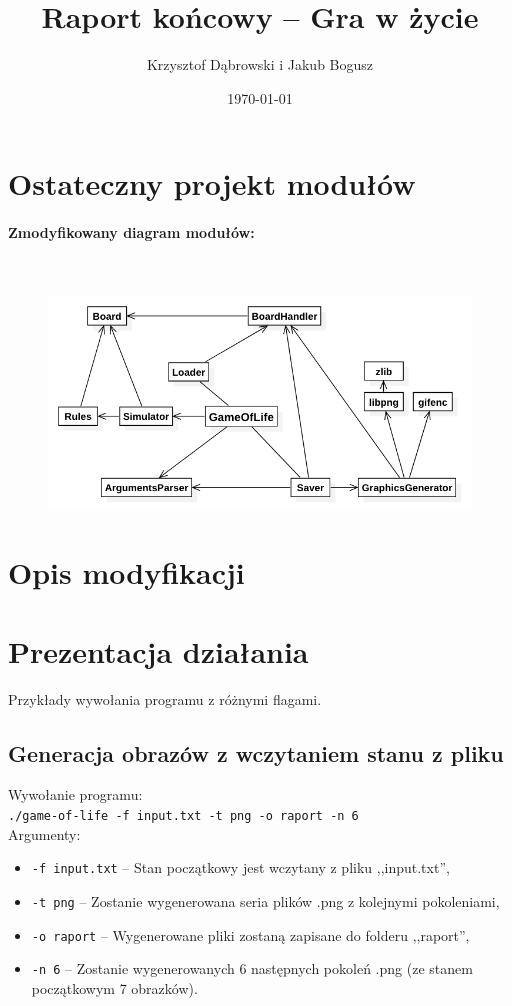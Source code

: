 \documentclass{mwart}
\title{Raport końcowy -- Gra w życie}
\author{Krzysztof Dąbrowski i Jakub Bogusz}
\date{\today}
\begin{document}
\maketitle{}

\tableofcontents{}

\section{Ostateczny projekt modułów}
\paragraph{Zmodyfikowany diagram modułów:}\mbox{}\\
\begin{figure}[H]
	\centering
	\def\svgwidth{\columnwidth}
	\includegraphics[width=13cm]{diagram_modulow.png}
\end{figure}

\section{Opis modyfikacji}

\section{Prezentacja działania}
Przykłady wywołania programu z różnymi flagami.

\subsection{Generacja obrazów z wczytaniem stanu z pliku}
\noindent{}Wywołanie programu: \\
\texttt{./game-of-life -f input.txt -t png -o raport -n 6} \\
Argumenty:
\begin{itemize}
\item \texttt{-f input.txt} -- Stan początkowy jest wczytany z pliku ,,input.txt'',
\item \texttt{-t png} -- Zostanie wygenerowana seria plików .png z kolejnymi pokoleniami,
\item \texttt{-o raport} -- Wygenerowane pliki zostaną zapisane do folderu ,,raport'',
\item \texttt{-n 6} -- Zostanie wygenerowanych 6 następnych pokoleń .png (ze stanem początkowym 7 obrazków).
\end{itemize}
\end{document}
